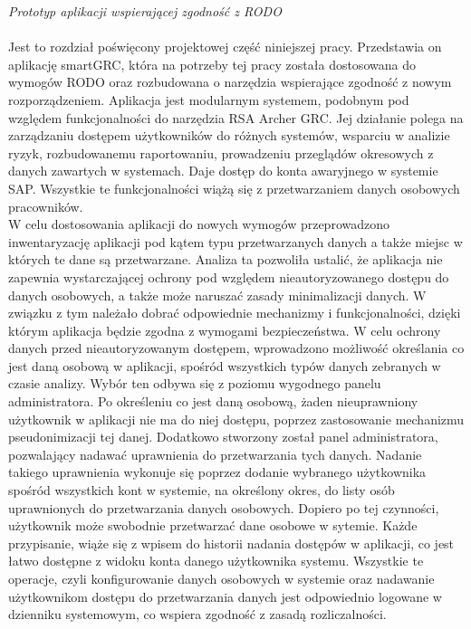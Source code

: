 \documentclass[en, noamssymb]{mgr}
\begin{document}
\indent \textit{Prototyp aplikacji wspierającej zgodność z RODO} \\ \\
\indent Jest to rozdział poświęcony projektowej część niniejszej pracy. Przedstawia on aplikację smartGRC, która na potrzeby tej pracy została dostosowana do wymogów RODO oraz rozbudowana o narzędzia wspierające zgodność z nowym rozporządzeniem. Aplikacja jest modularnym systemem, podobnym pod względem funkcjonalności do narzędzia RSA Archer GRC. Jej działanie polega na zarządzaniu dostępem użytkowników do różnych systemów, wsparciu w analizie ryzyk, rozbudowanemu raportowaniu, prowadzeniu przeglądów okresowych z danych zawartych w systemach. Daje dostęp do konta awaryjnego w systemie SAP. Wszystkie te funkcjonalności wiążą się z przetwarzaniem danych osobowych pracowników. \\
\indent W celu dostosowania aplikacji do nowych wymogów przeprowadzono inwentaryzację aplikacji pod kątem typu przetwarzanych danych a także miejsc w których te dane są przetwarzane. Analiza ta pozwoliła ustalić, że aplikacja nie zapewnia wystarczającej ochrony pod względem nieautoryzowanego dostępu do danych osobowych, a także może naruszać zasady minimalizacji danych. W związku z tym należało dobrać odpowiednie mechanizmy i funkcjonalności, dzięki którym aplikacja będzie zgodna z wymogami bezpieczeństwa. W celu ochrony danych przed nieautoryzowanym dostępem, wprowadzono możliwość określania co jest daną osobową w aplikacji, spośród wszystkich typów danych zebranych w czasie analizy. Wybór ten odbywa się z poziomu wygodnego panelu administratora. Po określeniu co jest daną osobową, żaden nieuprawniony użytkownik w aplikacji nie ma do niej dostępu, poprzez zastosowanie mechanizmu pseudonimizacji tej danej. Dodatkowo stworzony został panel administratora, pozwalający nadawać uprawnienia do przetwarzania tych danych. Nadanie takiego uprawnienia wykonuje się poprzez dodanie wybranego użytkownika spośród wszystkich kont w systemie, na określony okres, do listy osób uprawnionych do przetwarzania danych osobowych. Dopiero po tej czynności, użytkownik może swobodnie przetwarzać dane osobowe w sytemie. Każde przypisanie, wiąże się z wpisem do historii nadania dostępów w aplikacji, co jest łatwo dostępne z widoku konta danego użytkownika systemu. Wszystkie te operacje, czyli konfigurowanie danych osobowych w systemie oraz nadawanie użytkownikom dostępu do przetwarzania danych jest odpowiednio logowane w dzienniku systemowym, co wspiera zgodność z zasadą rozliczalności.\\
\end{document}
